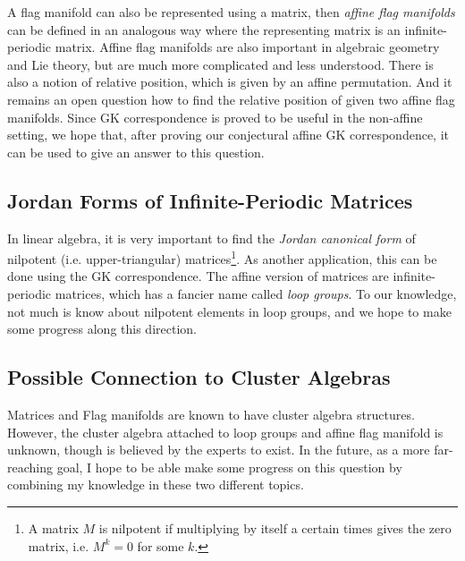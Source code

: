 \documentclass[11pt]{amsart}
\begin{document}
A flag manifold can also be represented using a matrix, then \emph{affine flag manifolds} can be defined in an analogous way where the representing matrix is an infinite-periodic matrix. Affine flag manifolds are also important in algebraic geometry and Lie theory, but are much more complicated and less understood. There is also a notion of relative position, which is given by an affine permutation. And it remains an open question how to find the relative position of given two affine flag manifolds. Since GK correspondence is proved to be useful in the non-affine setting, we hope that, after proving our conjectural affine GK correspondence, it can be used to give an answer to this question.

\subsection*{Jordan Forms of Infinite-Periodic Matrices} In linear algebra, it is very important to find the \emph{Jordan canonical form} of nilpotent (i.e. upper-triangular) matrices\footnote{A matrix $M$ is nilpotent if multiplying by itself a certain times gives the zero matrix, i.e. $M^k=0$ for some $k$.}. As another application, this can be done using the GK correspondence. 
The affine version of matrices are infinite-periodic matrices, which has a fancier name called \emph{loop groups}. To our knowledge, not much is know about nilpotent elements in loop groups, and we hope to make some progress along this direction.

\subsection*{Possible Connection to Cluster Algebras} Matrices and Flag manifolds are known to have cluster algebra structures. However, the cluster algebra attached to loop groups and affine flag manifold is unknown, though is believed by the experts to exist. In the future, as a more far-reaching goal, I hope to be able make some progress on this question by combining my knowledge in these two different topics.
\end{document}
